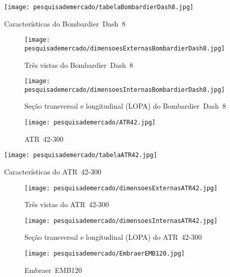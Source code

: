 \begin{table}
\centering
\texttt{[image: pesquisademercado/tabelaBombardierDash8.jpg]}
\caption{Características do Bombardier~Dash~8}
\end{table}

\begin{sidewaysfigure}[p]
\texttt{[image: pesquisademercado/dimensoesExternasBombardierDash8.jpg]}
\caption{Três vistas do Bombardier~Dash~8}
\end{sidewaysfigure}

\begin{sidewaysfigure}[p]
\texttt{[image: pesquisademercado/dimensoesInternasBombardierDash8.jpg]}
\caption{Seção transversal e longitudinal (LOPA) do Bombardier~Dash~8}
\end{sidewaysfigure}

\clearpage
\begin{figure}
\centering
\texttt{[image: pesquisademercado/ATR42.jpg]}
\caption{ATR~42-300}
\end{figure}

\begin{table}
\centering
\texttt{[image: pesquisademercado/tabelaATR42.jpg]}
\caption{Características do ATR~42-300}
\end{table}

\begin{sidewaysfigure}[p]
\texttt{[image: pesquisademercado/dimensoesExternasATR42.jpg]}
\caption{Três vistas do ATR~42-300}
\end{sidewaysfigure}

\begin{sidewaysfigure}[p]
\texttt{[image: pesquisademercado/dimensoesInternasATR42.jpg]}
\caption{Seção transversal e longitudinal (LOPA) do ATR~42-300}
\end{sidewaysfigure}

\clearpage
\begin{figure}
\centering
\texttt{[image: pesquisademercado/EmbraerEMB120.jpg]}
\caption{Embraer~EMB120}
\end{figure}


